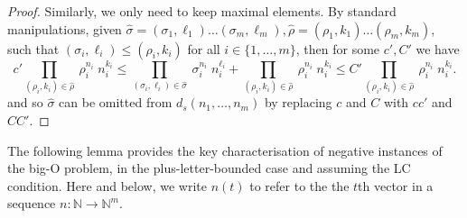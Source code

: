 \documentclass{lmcs}
\theoremstyle{plain}
\theoremstyle{definition}
\theoremstyle{remark}
\newcommand\dgf{d}
\newcommand\nat[1]{\ensuremath{\{1,\dots,#1\}}}
\begin{document}
\begin{proof}
Similarly, we only need to keep maximal elements. By standard manipulations, given $\hat{\sigma}=(\sigma_1,\ell_1)\dots(\sigma_m,\ell_m),\hat{\rho}=(\rho_1,k_1)\dots(\rho_m,k_m)$,  such that $(\sigma_i,\ell_i) \le (\rho_i,k_i)$ for all $i\in\nat{m}$, then for some $c',C'$ we have
\[
 c' \prod_{(\rho_i,k_i) \in \hat{\rho}} \ \rho_i^{n_i} \; n_i^{k_i}
 \le \prod_{(\sigma_i,\ell_i) \in \hat{\sigma}} \ \sigma_i^{n_i} \; n_i^{\ell_i}
  + \prod_{(\rho_i,k_i) \in \hat{\rho}} \ \rho_i^{n_i} \; n_i^{k_i}
  \le C' \prod_{(\rho_i,k_i) \in \hat{\rho}} \ \rho_i^{n_i} \; n_i^{k_i}.\] and so  $\hat{\sigma}$ can be omitted from $\dgf_s(n_1,\dots,n_m)$ by replacing $c$ and $C$ with $cc'$ and $CC'$.
\end{proof}

The following lemma provides the key characterisation of negative instances of the big-O problem, in the plus-letter-bounded case and assuming the LC condition. Here and below, we write $n(t)$ to refer to the the $t$th vector in a sequence $n\colon \mathbb{N}\to\mathbb{N}^m$.
\end{document}
